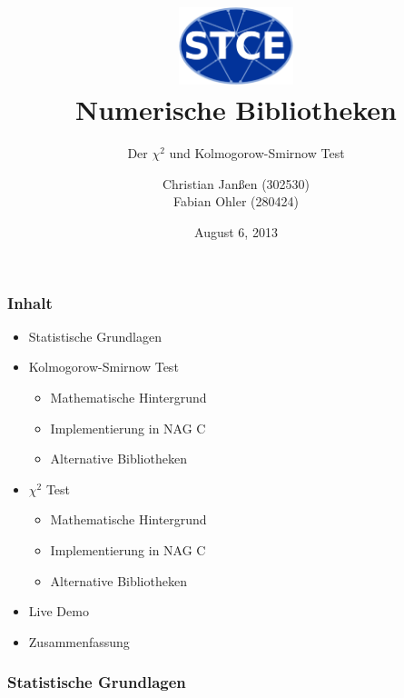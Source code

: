 \documentclass{beamer}
\begin{document}
\title{\centering
\includegraphics[width=0.25\textwidth]{./figures/logo.eps} \\ Numerische Bibliotheken}

\subtitle{Der $\chi^2$ und Kolmogorow-Smirnow Test}
\author{Christian Janßen (302530) \\ Fabian Ohler (280424) }
\date{August 6, 2013}
\frame[plain]{\titlepage}

\begin{frame}
\frametitle{Inhalt}
	\begin{itemize}
		\item Statistische Grundlagen
		\item Kolmogorow-Smirnow Test
		\begin{itemize}
			\item Mathematische Hintergrund
			\item Implementierung in NAG C
			\item Alternative Bibliotheken
		\end{itemize}
		\item $\chi^2$ Test
		\begin{itemize}
			\item Mathematische Hintergrund
			\item Implementierung in NAG C
			\item Alternative Bibliotheken
		\end{itemize}
		\item Live Demo
		\item Zusammenfassung
	\end{itemize}
\end{frame}

\begin{frame}
\frametitle{Statistische Grundlagen}
\end{frame}
\end{document}
